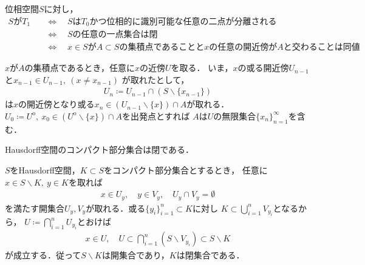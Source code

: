 	\begin{screen}
		\begin{thm}[$T_1$空間とは一点集合が閉である空間]
			位相空間$S$に対し，
			\begin{align}
				\mbox{$S$が$T_1$}
				&\quad \Longleftrightarrow \quad \mbox{$S$は$T_0$かつ位相的に識別可能な任意の二点が分離される} \\
				&\quad \Longleftrightarrow \quad \mbox{$S$の任意の一点集合は閉} \\
				&\quad \Longleftrightarrow \quad \mbox{$x \in S$が$A \subset S$の集積点であることと$x$の任意の開近傍が$A$と交わることは同値}.
			\end{align}
		\end{thm}
	\end{screen}
	
	\begin{prf}
		$x$が$A$の集積点であるとき，任意に$x$の近傍$U$を取る．
		いま，$x$の或る開近傍$U_{n-1}$と$x_{n-1} \in U_{n-1},\ (x \neq x_{n-1})$
		が取れたとして，
		\begin{align}
			U_n \coloneqq U_{n-1} \cap (S \backslash \{x_{n-1}\})
		\end{align}
		は$x$の開近傍となり或る$x_n \in (U_{n-1} \backslash \{x\}) \cap A$が取れる．
		$U_0 \coloneqq U^{\mathrm{o}},\ 
		x_0 \in (U^{\mathrm{o}} \backslash \{x\}) \cap A$を出発点とすれば
		$A$は$U$の無限集合$\{x_n\}_{n=1}^\infty$を含む．
	\end{prf}
	
	\begin{screen}
		\begin{thm}[Hausdorff空間のコンパクト部分集合は閉]
			Hausdorff空間のコンパクト部分集合は閉である．
		\end{thm}
	\end{screen}
	
	\begin{prf}
		$S$をHausdorff空間，$K \subset S$をコンパクト部分集合とするとき，
		任意に$x \in S \backslash K,\ y \in K$を取れば
		\begin{align}
			x \in U_y,\quad y \in V_y, \quad U_y \cap V_y = \emptyset
		\end{align}
		を満たす開集合$U_y,V_y$が取れる．或る$\{y_i\}_{i=1}^n \subset K$に対し
		$K \subset \bigcup_{i=1}^n V_{y_i}$となるから，
		$U \coloneqq \bigcap_{i=1}^n U_{y_i}$とおけば
		\begin{align}
			x \in U,\quad U \subset \bigcap_{i=1}^n \left(S\backslash V_{y_i}\right)
			\subset S \backslash K
		\end{align}
		が成立する．従って$S \backslash K$は開集合であり，$K$は閉集合である．
		\QED
	\end{prf}
	
